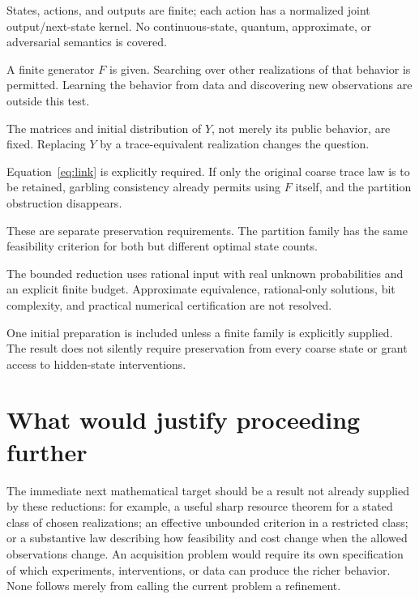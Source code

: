 \documentclass[11pt]{article}
\begin{document}
\begin{description}[style=nextline,leftmargin=0pt]
\item[Finite controlled stochastic models]
States, actions, and outputs are finite; each action has a normalized joint output/next-state kernel. No continuous-state, quantum, approximate, or adversarial semantics is covered.
\item[Supplied richer behavior]
A finite generator $F$ is given. Searching over other realizations of that behavior is permitted. Learning the behavior from data and discovering new observations are outside this test.
\item[Chosen coarse realization]
The matrices and initial distribution of $Y$, not merely its public behavior, are fixed. Replacing $Y$ by a trace-equivalent realization changes the question.
\item[Strong labelled state comparison]
Equation~\eqref{eq:link} is explicitly required. If only the original coarse trace law is to be retained, garbling consistency already permits using $F$ itself, and the partition obstruction disappears.
\item[Stochastic versus deterministic comparison]
These are separate preservation requirements. The partition family has the same feasibility criterion for both but different optimal state counts.
\item[Exact probabilities and state budget]
The bounded reduction uses rational input with real unknown probabilities and an explicit finite budget. Approximate equivalence, rational-only solutions, bit complexity, and practical numerical certification are not resolved.
\item[Preparation and observation scope]
One initial preparation is included unless a finite family is explicitly supplied. The result does not silently require preservation from every coarse state or grant access to hidden-state interventions.
\end{description}

\section{What would justify proceeding further}

The immediate next mathematical target should be a result not already supplied by these reductions: for example, a useful sharp resource theorem for a stated class of chosen realizations; an effective unbounded criterion in a restricted class; or a substantive law describing how feasibility and cost change when the allowed observations change. An acquisition problem would require its own specification of which experiments, interventions, or data can produce the richer behavior. None follows merely from calling the current problem a refinement.
\end{document}
